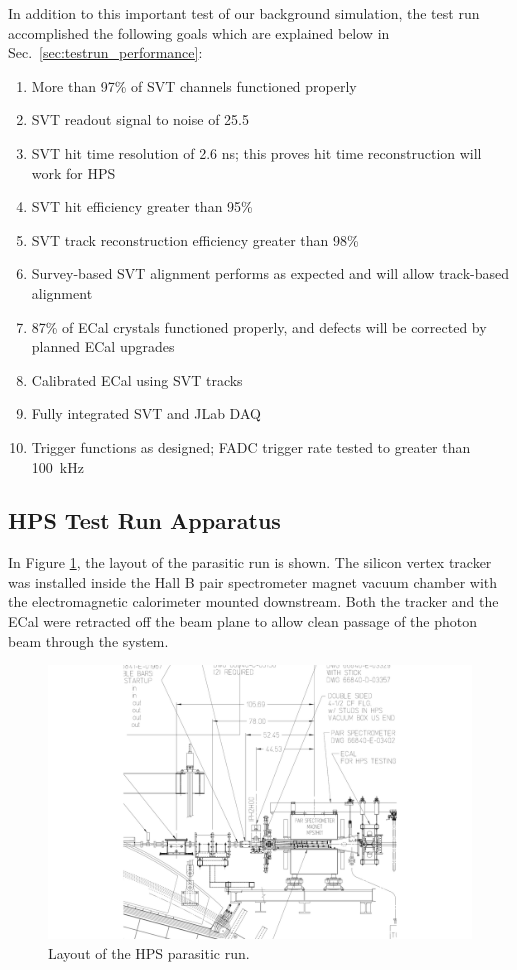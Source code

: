 In addition to this important test of our background simulation, the test run accomplished the following goals which are explained below in Sec.~\ref{sec:testrun_performance}:
\begin{enumerate}
	\item More than 97\% of SVT channels functioned properly
	\item SVT readout signal to noise of 25.5
	\item SVT hit time resolution of 2.6 ns; this proves hit time reconstruction will work for HPS
	\item SVT hit efficiency greater than 95\%
	\item SVT track reconstruction efficiency greater than 98\%
	\item Survey-based SVT alignment performs as expected and will allow track-based alignment
	\item 87\% of ECal crystals functioned properly, and defects will be corrected by planned ECal upgrades
	\item Calibrated ECal using SVT tracks
	\item Fully integrated SVT and JLab DAQ
	\item Trigger functions as designed; FADC trigger rate tested to greater than 100~kHz
\end{enumerate}

\subsection{HPS Test Run Apparatus } 

In Figure \ref{fig:hpstest_layout}, the layout of the parasitic run is shown. The silicon vertex tracker was installed inside the Hall B pair spectrometer magnet vacuum chamber with the electromagnetic calorimeter mounted downstream.
Both the tracker and the ECal were retracted off the beam plane to allow clean passage of the photon beam through the system.
 
\begin{figure}[ht]
    \includegraphics[width=\textwidth]{test2012/HPS_dimensions}
\caption{\small{Layout of the HPS parasitic run.} }
\label{fig:hpstest_layout}
\end{figure}

